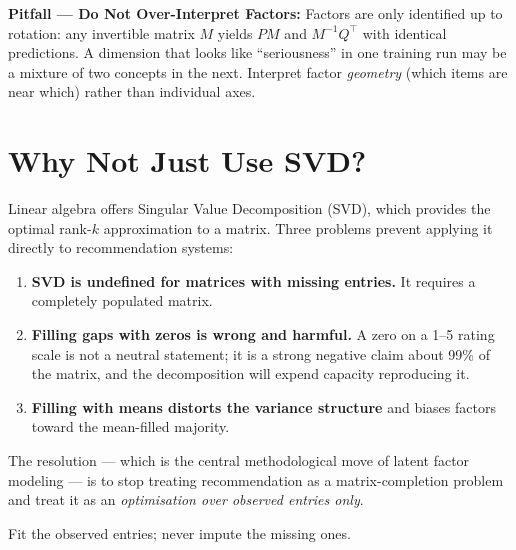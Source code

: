 \documentclass[12pt,a4paper]{article}
\begin{document}
\begin{example}
\textbf{Pitfall --- Do Not Over-Interpret Factors:} Factors are only identified up to rotation: any invertible matrix $M$ yields $P M$ and $M^{-1}Q^{\top}$ with identical predictions. A dimension that looks like ``seriousness'' in one training run may be a mixture of two concepts in the next. Interpret factor \emph{geometry} (which items are near which) rather than individual axes.
\end{example}

\section{Why Not Just Use SVD?}

Linear algebra offers Singular Value Decomposition (SVD), which provides the optimal rank-$k$ approximation to a matrix. Three problems prevent applying it directly to recommendation systems:

\begin{enumerate}
    \item \textbf{SVD is undefined for matrices with missing entries.} It requires a completely populated matrix.
    \item \textbf{Filling gaps with zeros is wrong and harmful.} A zero on a 1--5 rating scale is not a neutral statement; it is a strong negative claim about 99\% of the matrix, and the decomposition will expend capacity reproducing it.
    \item \textbf{Filling with means distorts the variance structure} and biases factors toward the mean-filled majority.
\end{enumerate}

The resolution --- which is the central methodological move of latent factor modeling --- is to stop treating recommendation as a matrix-completion problem and treat it as an \emph{optimisation over observed entries only}.

\begin{center}
\begin{tcolorbox}[enhanced,width=0.94\textwidth,colback=yellow!15,colframe=orange!80!black,
  boxrule=1.2pt,arc=3pt,halign=center,fontupper=\normalsize\sffamily\itshape\color{blue!80!black}]
Fit the observed entries; never impute the missing ones.
\end{tcolorbox}
\end{center}
\end{document}
